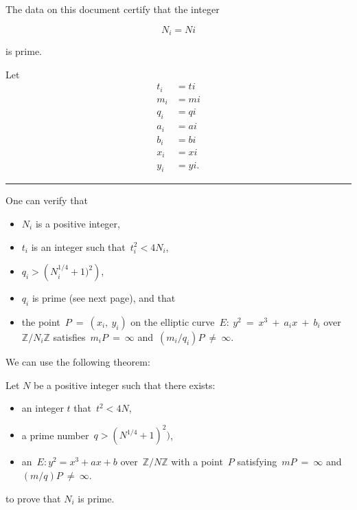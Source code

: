 \pagestyle{empty}
\phantom{a}
\vspace{2em}

\begin{center}
{\Huge {}}
\end{center}
\vspace{2em}

\noindent The data on this document certify that the integer

{\tiny
$$
N_{ {{ i }} } = {{ Ni }}
$$
}

\noindent is prime.

\vspace{2em}

\noindent Let
{\tiny
\begin{align*}
t_{ {{ i }} } &= {{ ti }} \\
m_{ {{ i }} } &= {{ mi }} \\
q_{ {{ i }} } &= {{ qi }} \\
a_{ {{ i }} } &= {{ ai }} \\
b_{ {{ i }} } &= {{ bi }} \\
x_{ {{ i }} } &= {{ xi }} \\
y_{ {{ i }} } &= {{ yi }}.
\end{align*}
}

\vspace{0.5em}
\hrule
\vspace{0.5em}

\begin{multicols}{2}
\noindent One can verify that
\begin{itemize}
\item $N_{ {{ i }} }$ is a positive integer,
\item $t_{ {{ i }} }$ is an integer such that~$t_{ {{ i }} }^2 < 4N_{ {{ i }} }$,
\item $q_{ {{ i }} } > \left(N_{ {{ i }} }^{1/4} + 1)^2\right)$,
\item $q_{ {{ i }} }$ is prime (see next page), and that
\item the point~$P~=~(x_{ {{ i }} },~y_{ {{ i }} })$ on the elliptic curve~$E:~y^2~=~x^3~+~a_{ {{ i }} }x~+~b_{ {{ i }} }$ over~$\mathbb{Z}/{N_{ {{ i }} }}\mathbb{Z}$ satisfies~$m_{ {{ i }} }P~=~\infty$ and~$(m_{ {{ i }} }/q_{ {{ i }} })P~\neq~\infty$.
\end{itemize}
\columnbreak
\noindent We can use the following theorem:
\begin{theorem*}
Let $N$ be a positive integer such that there exists:
\begin{itemize}
\item an integer $t$ that~$t^2 < 4N$,
\item a prime number~$q > (N^{1/4} + 1)^2)$,
\item an~$E: y^2 = x^3 + ax + b$ over~$\mathbb{Z}/{N}\mathbb{Z}$ with a point~$P$ satisfying~$mP~=~\infty$ and~$(m/q)P~\neq~\infty$.
\end{itemize}
\end{theorem*}
\noindent to prove that $N_{ {{ i }} }$ is prime.
\end{multicols}

\newpage